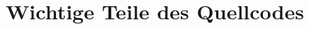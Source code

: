 \section{Wichtige Teile des Quellcodes}

	\setcounter{chapter}{5}
	\setcounter{section}{0}
	\setcounter{table}{0}
	\setcounter{figure}{0}

\begin{comment}	
	Auf den folgenden Seiten wird eine Möglichkeit gezeigt, wie aus einem anderen PDF-Dokument komplette Seiten übernommen werden können, z.~B. zum Einbindungen von Datenblättern. Der Nachteil dieser Methode besteht darin, dass sämtliche Formateinstellungen (Kopfzeilen, Seitenzahlen, Ränder, etc.) auf diesen Seiten nicht angezeigt werden. Die Methode wird deshalb eher selten gewählt. Immerhin sorgt das Package \textit{\glqq pdfpages\grqq}~für eine korrekte Seitenzahleinstellung auf den im Anschluss folgenden \glqq nativen\grqq~\LaTeX-Seiten.
	
	Eine bessere Alternative ist, einzelne Seiten mit \textit{\glqq$\backslash$includegraphics\grqq}~einzubinden.
	
	
\end{comment}

